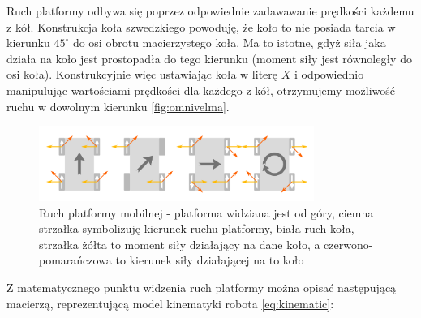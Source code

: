 Ruch platformy odbywa się poprzez odpowiednie zadawawanie prędkości każdemu z kół. Konstrukcja koła szwedzkiego powoduję, że koło to nie posiada tarcia w kierunku $45^{\circ}$ do osi obrotu macierzystego koła. Ma to istotne, gdyż siła jaka działa na koło jest prostopadła do tego kierunku (moment siły jest równoległy do osi koła). Konstrukcyjnie więc ustawiając koła w literę $X$ i odpowiednio manipulując wartościami prędkości dla każdego z kół, otrzymujemy możliwość ruchu w dowolnym kierunku \ref{fig:omnivelma}.

\begin{figure}[H]
	\centering
	\includegraphics[width=0.8\textwidth]{gfx/vectors.png}
	\caption{Ruch platformy mobilnej - platforma widziana jest od góry, ciemna strzałka symbolizuję kierunek ruchu platformy, biała ruch koła, strzałka żółta to moment siły działający na dane koło, a czerwono-pomarańczowa to kierunek siły działającej na to koło \cite{omnivelma}}
	\label{fig:vectors}
\end{figure}

Z matematycznego punktu widzenia ruch platformy można opisać następującą macierzą, reprezentującą model kinematyki robota \ref{eq:kinematic}:

